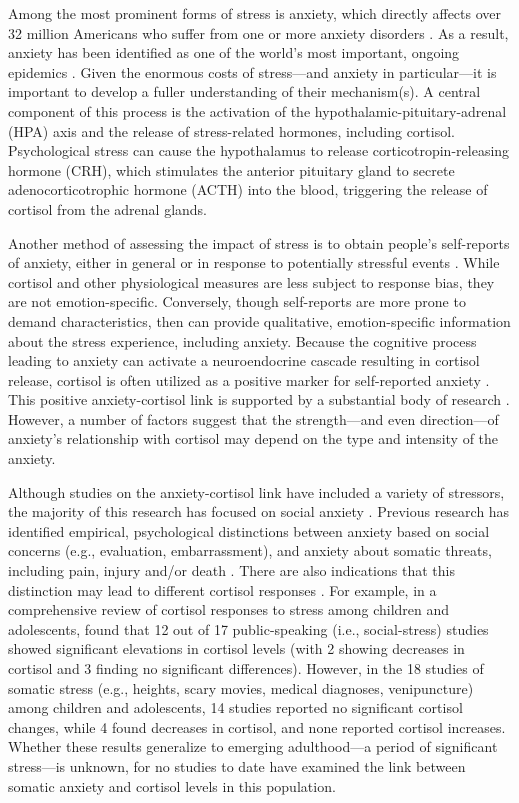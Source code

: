 \documentclass[review]{elsarticle}\usepackage[]{graphicx}\usepackage[]{color}
\begin{document}
Among the most prominent forms of stress is anxiety, which directly affects over 32 million Americans who suffer from one or more anxiety disorders \cite{kessler2005prevalence}.
As a result, anxiety has been identified as one of the world's most important, ongoing epidemics \cite{jessop2004brief}.
Given the enormous costs of stress---and anxiety in particular---it is important to develop a fuller understanding of their mechanism(s).
A central component of this process is the activation of the hypothalamic-pituitary-adrenal (HPA) axis and the release of stress-related hormones, including cortisol.
Psychological stress can cause the hypothalamus to release corticotropin-releasing hormone (CRH), which stimulates the anterior pituitary gland to secrete adenocorticotrophic hormone (ACTH) into the blood, triggering the release of cortisol from the adrenal glands.

Another method of assessing the impact of stress is to obtain people's self-reports of anxiety, either in general \cite{adkins2008psychometric} or in response to potentially stressful events \cite{leininger2012cortisol}.
While cortisol and other physiological measures are less subject to response bias, they are not emotion-specific.
Conversely, though self-reports are more prone to demand characteristics, then can provide qualitative, emotion-specific information about the stress experience, including anxiety.
Because the cognitive process leading to anxiety can activate a neuroendocrine cascade resulting in cortisol release, cortisol is often utilized as a positive marker for self-reported anxiety \cite{kirschbaum1993trier}.
This positive anxiety-cortisol link is supported by a substantial body of research \cite{kelly2008sex,boudarene2001study}. 
However, a number of factors suggest that the strength---and even direction---of anxiety's relationship with cortisol may depend on the type and intensity of the anxiety.

Although studies on the anxiety-cortisol link have included a variety of stressors, the majority of this research has focused on social anxiety \cite{campbell2012acute}.
Previous research has identified empirical, psychological distinctions between anxiety based on social concerns (e.g., evaluation, embarrassment), and anxiety about somatic threats, including pain, injury and/or death \cite{taylor1999anxiety}.
There are also indications that this distinction may lead to different cortisol responses \cite{turner2010sex}.
For example, in a comprehensive review of cortisol responses to stress among children and adolescents, \cite{gunnar2009stressor} found that 12 out of 17 public-speaking (i.e., social-stress) studies showed significant elevations in cortisol levels (with 2 showing decreases in cortisol and 3 finding no significant differences).
However, in the 18 studies of somatic stress (e.g., heights, scary movies, medical diagnoses, venipuncture) among children and adolescents, 14 studies reported no significant cortisol changes, while 4 found decreases in cortisol, and none reported cortisol increases.
Whether these results generalize to emerging adulthood---a period of significant stress---is unknown, for no studies to date have examined the link between somatic anxiety and cortisol levels in this population.
\end{document}
